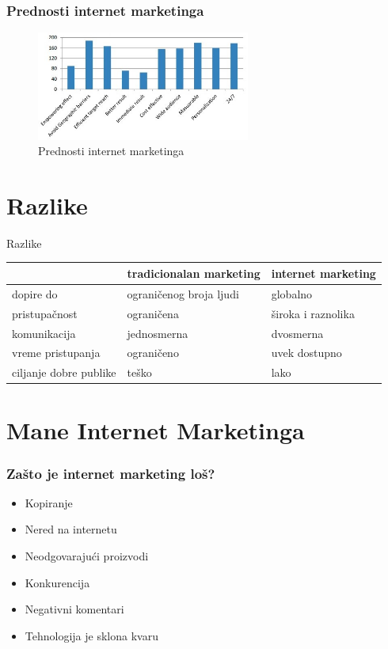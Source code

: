 \documentclass{beamer}
\begin{document}
\begin{frame}[fragile]\frametitle{Prednosti internet marketinga}
\begin{figure}[h!]
\begin{center}
\includegraphics[width=7cm]{slika.prednosti.marketinga.jpg}
\end{center}
\caption{Prednosti internet marketinga}
\label{fig:prednosti}
\end{figure}
\end{frame}






\section{Razlike}
\begin{frame}{Razlike}
\begin{center}
\begin{tabular}{|p{2cm}|p{3.1cm}|p{3.1cm}|} \hline
     &\centering tradicionalan marketing& internet marketing\\ \hline
 \centering dopire do& ograničenog broja \centering ljudi & globalno\\   \hline
\centering pristupačnost & ograničena& široka i raznolika\\ \hline
\centering komunikacija & jednosmerna& dvosmerna\\\hline
 \centering vreme pristupanja& ograničeno& uvek dostupno \\ \hline
\centering ciljanje dobre  publike &  teško &  lako  \\ \hline
\end{tabular}
\label{tab:tabela1}
\end{center}
\end{frame}


\section{Mane Internet Marketinga}

\begin{frame}[fragile]\frametitle{Zašto je internet marketing loš?}
	\begin{itemize}	
		\item  Kopiranje
		\item  Nered na internetu
		\item  Neodgovarajući proizvodi
		\item  Konkurencija
		\item  Negativni komentari
		\item  Tehnologija je sklona kvaru
	\end{itemize}
\end{frame}
\end{document}
